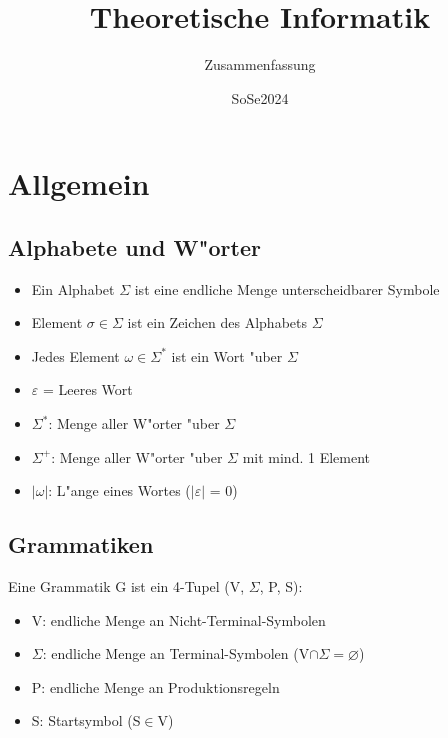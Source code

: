 \documentclass[11pt, a4paper]{scrartcl}
\title{Theoretische Informatik}
\author{Zusammenfassung}
\date{SoSe2024}
\begin{document}
\maketitle

\tableofcontents
\newpage



\section{Allgemein}

\vspace{0.5em}

\subsection{Alphabete und W"orter}

\begin{itemize}
    \item Ein Alphabet $\Sigma$ ist eine endliche Menge unterscheidbarer Symbole
    \item Element $\sigma \in \Sigma$ ist ein Zeichen des Alphabets $\Sigma$
    \item Jedes Element $\omega \in \Sigma^*$  ist ein Wort "uber $\Sigma$
    \item $\varepsilon$ = Leeres Wort
    \item $\Sigma^*$: Menge aller W"orter "uber $\Sigma$
    \item $\Sigma^+$: Menge aller W"orter "uber $\Sigma$ mit mind. 1 Element
    \item $|\omega|$: L"ange eines Wortes ($|\varepsilon|$ = 0)
\end{itemize}

\vspace{1em}

\subsection{Grammatiken}

Eine Grammatik G ist ein 4-Tupel (V, $\Sigma$, P, S):
\begin{itemize}
    \item V: endliche Menge an Nicht-Terminal-Symbolen
    \item $\Sigma$: endliche Menge an Terminal-Symbolen (V$\cap\Sigma=\varnothing$)
    \item P: endliche Menge an Produktionsregeln
    \item S: Startsymbol (S$\in$V)
\end{itemize}
\end{document}
